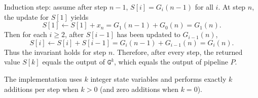 \documentclass[11pt]{article}
\newcommand{\G}{\texttt{G}}
\begin{document}
Induction step: assume after step $n-1$, $S[i]=G_i(n-1)$ for all $i$. At step $n$, the update for $S[1]$ yields
\[
S[1]\leftarrow S[1]+x_n=G_1(n-1)+G_0(n)=G_1(n).
\]
Then for each $i\ge 2$, after $S[i-1]$ has been updated to $G_{i-1}(n)$,
\[
S[i]\leftarrow S[i]+S[i-1]=G_i(n-1)+G_{i-1}(n)=G_i(n).
\]
Thus the invariant holds for step $n$. Therefore, after every step, the returned value $S[k]$ equals the output of $\G^k$, which equals the output of pipeline $P$.

The implementation uses $k$ integer state variables and performs exactly $k$ additions per step when $k>0$ (and zero additions when $k=0$).



\end{document}
